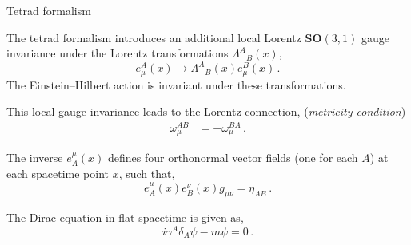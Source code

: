 \documentclass[12pt,titlepage]{article}
\begin{document}
\begin{frame}{Tetrad formalism}
    \begin{list}{\,}{\leftmargin=1em \itemindent=0em}
        \item<1-> The tetrad formalism introduces an additional local Lorentz $\mathbf{SO}(3,1)$ gauge invariance under the Lorentz transformations ${\Lambda^A}_{B}(x)$,
        \begin{equation}
            e_\mu^A(x)\to {\Lambda^A}_{B}(x)e_\mu^B(x)\,.
        \end{equation}
        The Einstein–Hilbert action is invariant under these transformations.
        \item<2-> This local gauge invariance leads to the Lorentz connection, (\textit{metricity condition})
        \begin{align}
            \omega_\mu^{AB}&=-\omega_\mu^{BA}\,.
        \end{align}
        \item<3-> The inverse $e^\mu_A(x)$ defines four orthonormal vector fields (one for each $A$) at each spacetime point $x$, such that,
        \begin{equation}
            e^\mu_A(x)e^\nu_B(x)g_{\mu\nu}=\eta_{AB}\,.
        \end{equation}
        \item<4-> The Dirac equation in flat spacetime is given as,
        \begin{equation}
            i\gamma^A\delta_A\psi-m\psi=0\,.
        \end{equation}
    \end{list}
\end{frame}
\end{document}
